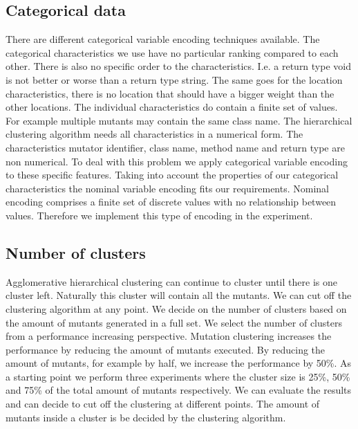 \documentclass[../../main]{subfiles}
\begin{document}
\subsection{Categorical data}
There are different categorical variable encoding techniques available\cite{Potdar2017AClassifiers}.
The categorical characteristics we use have no particular ranking compared to each other.
There is also no specific order to the characteristics.
I.e. a return type void is not better or worse than a return type string.
The same goes for the location characteristics, there is no location that should have a bigger weight than the other locations.
The individual characteristics do contain a finite set of values.
For example multiple mutants may contain the same class name.
The hierarchical clustering algorithm needs all characteristics in a numerical form\cite{Vijaya2019ComparativeClustering}.
The characteristics mutator identifier, class name, method name and return type are non numerical.
To deal with this problem we apply categorical variable encoding to these specific features.
Taking into account the properties of our categorical characteristics the nominal variable encoding fits our requirements.
Nominal encoding comprises a finite set of discrete values with no relationship between values\cite{Potdar2017AClassifiers}.
Therefore we implement this type of encoding in the experiment.

\subsection{Number of clusters}
Agglomerative hierarchical clustering can continue to cluster until there is one cluster left. 
Naturally this cluster will contain all the mutants.
We can cut off the clustering algorithm at any point.
We decide on the number of clusters based on the amount of mutants generated in a full set.
We select the number of clusters from a performance increasing perspective.
Mutation clustering increases the performance by reducing the amount of mutants executed\cite{Pizzoleto2019}.
By reducing the amount of mutants, for example by half, we increase the performance by 50\%\cite{Just2014AreTesting}.
As a starting point we perform three experiments where the cluster size is 25\%, 50\% and 75\% of the total amount of mutants respectively.
We can evaluate the results and can decide to cut off the clustering at different points.
The amount of mutants inside a cluster is be decided by the clustering algorithm.
\end{document}
